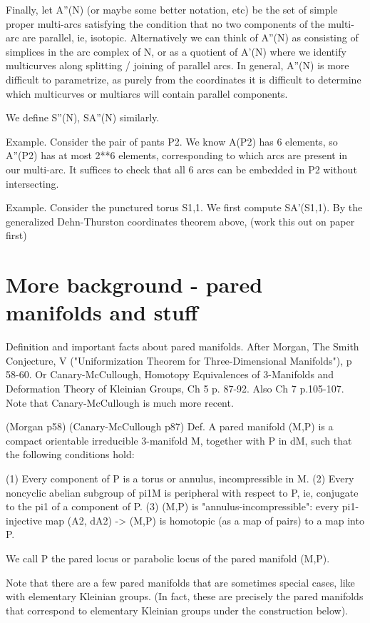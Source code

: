 \documentclass[12pt]{amsart}
\theoremstyle{definition}
\begin{document}
Finally, let A''(N) (or maybe some better notation, etc) be the set of simple
proper multi-arcs satisfying the condition that no two components of the
multi-arc are parallel, ie, isotopic. Alternatively we can think of A''(N) as
consisting of simplices in the arc complex of N, or as a quotient of A'(N)
where we identify multicurves along splitting / joining of parallel arcs. In
general, A''(N) is more difficult to parametrize, as purely from the
coordinates it is difficult to determine which multicurves or multiarcs will
contain parallel components.

We define S''(N), SA''(N) similarly.

Example. Consider the pair of pants P2. We know A(P2) has 6 elements, so
A''(P2) has at most 2**6 elements, corresponding to which arcs are present in
our multi-arc. It suffices to check that all 6 arcs can be
embedded in P2 without intersecting.

Example. Consider the punctured torus S1,1. We first compute SA'(S1,1). By the
generalized Dehn-Thurston coordinates theorem above, (work this out on paper
first)

\section{More background - pared manifolds and stuff}

Definition and important facts about pared manifolds. After Morgan, The Smith
Conjecture, V ("Uniformization Theorem for Three-Dimensional Manifolds"),
p 58-60. Or Canary-McCullough, Homotopy Equivalences of 3-Manifolds and
Deformation Theory of Kleinian Groups, Ch 5 p. 87-92. Also Ch 7 p.105-107. Note
that Canary-McCullough is much more recent.

(Morgan p58) (Canary-McCullough p87)
Def. A pared manifold (M,P) is a compact orientable irreducible 3-manifold M,
together with P in dM, such that the following conditions hold:

(1) Every component of P is a torus or annulus, incompressible in M.
(2) Every noncyclic abelian subgroup of pi1M is peripheral with respect to P,
ie, conjugate to the pi1 of a component of P.
(3) (M,P) is "annulus-incompressible": every pi1-injective map (A2, dA2) ->
(M,P) is homotopic (as a map of pairs) to a map into P.

We call P the pared locus or parabolic locus of the pared manifold (M,P).

Note that there are a few pared manifolds that are sometimes special cases,
like with elementary Kleinian groups. (In fact, these are precisely the pared
manifolds that correspond to elementary Kleinian groups under the construction
below).
\end{document}
